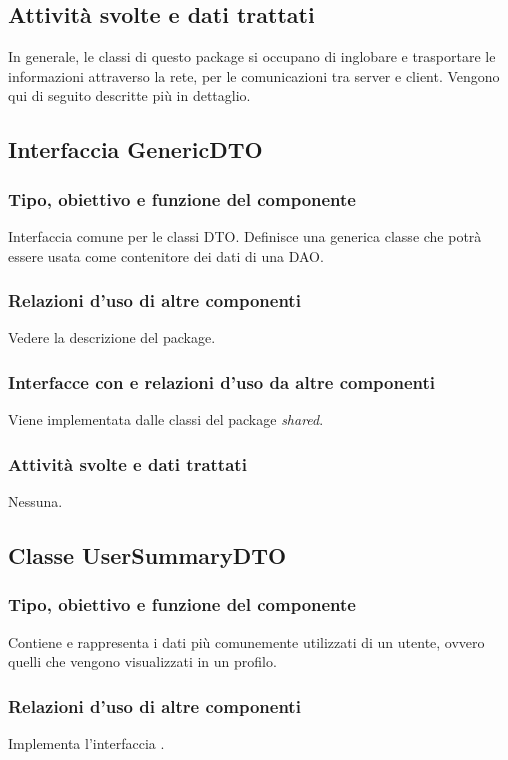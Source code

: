 \subsection*{Attivit\`a svolte e dati trattati}
In generale, le classi di questo package si occupano di inglobare e trasportare
le informazioni attraverso la rete, per le comunicazioni tra server e client.
Vengono qui di seguito descritte pi\`u in dettaglio.

\subsection{Interfaccia GenericDTO}
\subsubsection*{Tipo, obiettivo e funzione del componente}
Interfaccia comune per le classi DTO. Definisce una generica classe che potr\`a
essere usata come contenitore dei dati di una DAO.
\subsubsection*{Relazioni d'uso di altre componenti}
Vedere la descrizione del package.
\subsubsection*{Interfacce con e relazioni d'uso da altre componenti}
Viene implementata dalle classi del package \emph{shared}.
\subsubsection*{Attivit\`a svolte e dati trattati}
Nessuna. 

\subsection{Classe UserSummaryDTO}
\subsubsection*{Tipo, obiettivo e funzione del componente}
Contiene e rappresenta i dati pi\`u comunemente utilizzati di un utente, ovvero
quelli che vengono visualizzati in un profilo.
\subsubsection*{Relazioni d'uso di altre componenti}
Implementa l'interfaccia .
